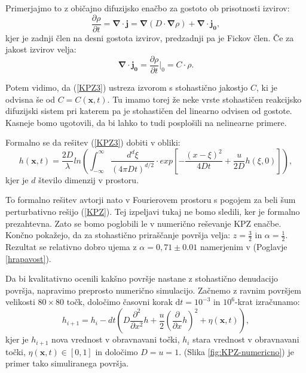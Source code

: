 \documentclass[a4paper, twoside, 12pt]{book}
\begin{document}
Primerjajmo to z običajno difuzijsko enačbo za gostoto ob prisotnosti izvirov:
\begin{equation}
  \frac{ \partial \rho}{ \partial t} = \mathbf{\nabla} \cdot \mathbf{j} = \mathbf{\nabla} (D \cdot \mathbf{\nabla} \rho) + \mathbf{\nabla} \cdot \mathbf{j_0},
  \label{dinamicna-splosna-3}
\end{equation}
kjer je zadnji člen na desni gostota izvirov, predzadnji pa je Fickov člen. Če za jakost izvirov velja:
\begin{equation}
  \mathbf{\nabla} \cdot \mathbf{j_0} = \frac{\partial \rho}{\partial t}\bigg|_{0} = C \cdot \rho.
  \label{jakost-izvirov}
\end{equation}

Potem vidimo, da (\ref{KPZ3}) ustreza izvorom s stohastično jakostjo $C$, ki je odvisna še od $C=C(\mathbf{x},t)$. Tu imamo torej že neke vrste stohastičen reakcijsko difuzijski sistem pri katerem pa je stohastičen del linearno odvisen od gostote. Kasneje bomo ugotovili, da bi lahko to tudi posplošili na nelinearne primere.

Formalno se da rešitev (\ref{KPZ3}) dobiti v obliki:
\begin{equation}
  h(\mathbf{x},t) = \frac{2 D}{\lambda} ln \left( \int_{-\infty}^{\infty} \frac{d^d \xi}{(4 \pi D t)^{d/2}} \cdot exp \left[-\frac{(x-\xi)^2}{4 D t} + \frac{u}{2 D}h(\xi,0) \right] \right),
\end{equation}
kjer je $d$ število dimenzij v prostoru.

    To formalno rešitev avtorji \cite{kardar1986dynamic} nato v Fourierovem prostoru s pogojem za beli šum perturbativno rešijo (\ref{KPZ}). Tej izpeljavi tukaj ne bomo sledili, ker je formalno prezahtevna. Zato se bomo poglobili le v numerično reševanje KPZ enačbe. Končno pokažejo, da za stohastično priraščanje površja velja: $z = \frac{3}{2}$ in $\alpha=\frac{1}{2}$. Rezultat se relativno dobro ujema z $\alpha =  0,71 \pm 0.01$ namerjenim v (Poglavje \ref{hrapavost}).

Da bi kvalitativno ocenili kakšno površje nastane z stohastično denudacijo površja, napravimo preprosto numerično simulacijo. Začnemo z ravnim površjem velikosti $80\times80$ točk, določimo časovni korak $\mathrm{d}t=10^{-3}$ in $10^6$-krat izračunamo:
\begin{equation} 
  h_{i+1} = h_i - dt (D \frac{\partial^2}{\partial x^2} h + \frac{u}{2} (\frac{\partial}{\partial x} h)^2 + \eta (\mathbf{x},t)),
\end{equation}
kjer je $h_{i+1}$ nova vrednost v obravnavani točki, $h_{i}$ stara vrednost v obravnavani točki, $\eta (\mathbf{x},t) \in [0,1]$ in določimo $D = u = 1$. (Slika \ref{fig:KPZ-numericno}) je primer tako simuliranega površja.
\end{document}
